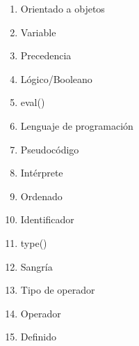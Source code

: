 
\begin{multicols}{4}
  \begin{enumerate}
    \item Orientado a objetos
    \item Variable
    \item Precedencia
    \item Lógico/Booleano
    \item eval()
    \item Lenguaje de programación
    \item Pseudocódigo
    \item Intérprete
    \item Ordenado
    \item Identificador
    \item type()
    \item Sangría
    \item Tipo de operador
    \item Operador
    \item Definido
  \end{enumerate}
\end{multicols}
